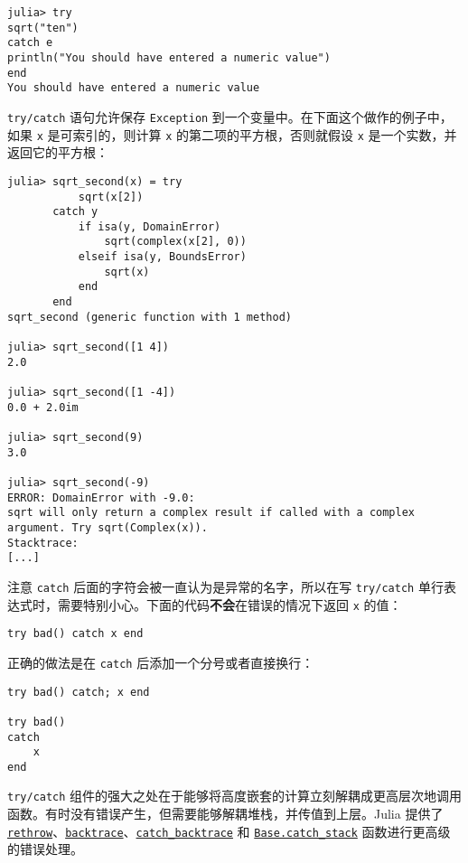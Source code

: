 \begin{verbatim}
julia> try
sqrt("ten")
catch e
println("You should have entered a numeric value")
end
You should have entered a numeric value
\end{verbatim}



\texttt{try/catch} 语句允许保存 \texttt{Exception} 到一个变量中。在下面这个做作的例子中，如果 \texttt{x} 是可索引的，则计算 \texttt{x} 的第二项的平方根，否则就假设 \texttt{x} 是一个实数，并返回它的平方根：




\begin{verbatim}
julia> sqrt_second(x) = try
           sqrt(x[2])
       catch y
           if isa(y, DomainError)
               sqrt(complex(x[2], 0))
           elseif isa(y, BoundsError)
               sqrt(x)
           end
       end
sqrt_second (generic function with 1 method)

julia> sqrt_second([1 4])
2.0

julia> sqrt_second([1 -4])
0.0 + 2.0im

julia> sqrt_second(9)
3.0

julia> sqrt_second(-9)
ERROR: DomainError with -9.0:
sqrt will only return a complex result if called with a complex argument. Try sqrt(Complex(x)).
Stacktrace:
[...]
\end{verbatim}



注意 \texttt{catch} 后面的字符会被一直认为是异常的名字，所以在写 \texttt{try/catch} 单行表达式时，需要特别小心。下面的代码\textbf{不会}在错误的情况下返回 \texttt{x} 的值：




\begin{verbatim}
try bad() catch x end
\end{verbatim}



正确的做法是在 \texttt{catch} 后添加一个分号或者直接换行：




\begin{verbatim}
try bad() catch; x end

try bad()
catch
    x
end
\end{verbatim}



\texttt{try/catch} 组件的强大之处在于能够将高度嵌套的计算立刻解耦成更高层次地调用函数。有时没有错误产生，但需要能够解耦堆栈，并传值到上层。Julia 提供了 \hyperlink{2102349972401293064}{\texttt{rethrow}}、\hyperlink{6187626674327343338}{\texttt{backtrace}}、\hyperlink{98342946516168163}{\texttt{catch\_backtrace}} 和 \hyperlink{5950075931444385711}{\texttt{Base.catch\_stack}} 函数进行更高级的错误处理。



